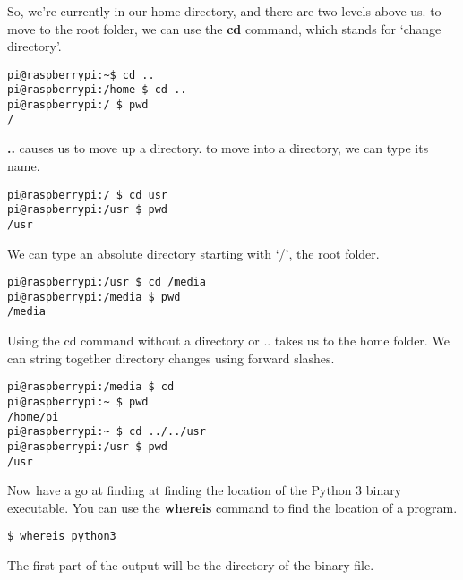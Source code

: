 		So, we're currently in our home directory, and there are two levels above us. to move to the root folder, we can use the \textbf{cd} command, which stands for `change directory'.
		
		\begin{lstlisting}[style=Terminal]
pi@raspberrypi:~$ cd ..
pi@raspberrypi:/home $ cd ..
pi@raspberrypi:/ $ pwd
/
		\end{lstlisting}

		\textbf{..} causes us to move up a directory. to move into a directory, we can type its name.
	
		\begin{lstlisting}[style=Terminal]
pi@raspberrypi:/ $ cd usr
pi@raspberrypi:/usr $ pwd
/usr
		\end{lstlisting}

		We can type an absolute directory starting with `/', the root folder. 
		
		\begin{lstlisting}[style=Terminal]
pi@raspberrypi:/usr $ cd /media
pi@raspberrypi:/media $ pwd
/media
		\end{lstlisting}

Using the cd command without a directory or .. takes us to the home folder. We can string together directory changes using forward slashes.

		\begin{lstlisting}[style=Terminal]
pi@raspberrypi:/media $ cd
pi@raspberrypi:~ $ pwd
/home/pi
pi@raspberrypi:~ $ cd ../../usr
pi@raspberrypi:/usr $ pwd
/usr
		\end{lstlisting}

		Now have a go at finding at finding the location of the Python 3 binary executable. You can use the \textbf{whereis} command to find the location of a program.
		
		\begin{lstlisting}[style=Terminal]
$ whereis python3
		\end{lstlisting}

		The first part of the output will be the directory of the binary file.